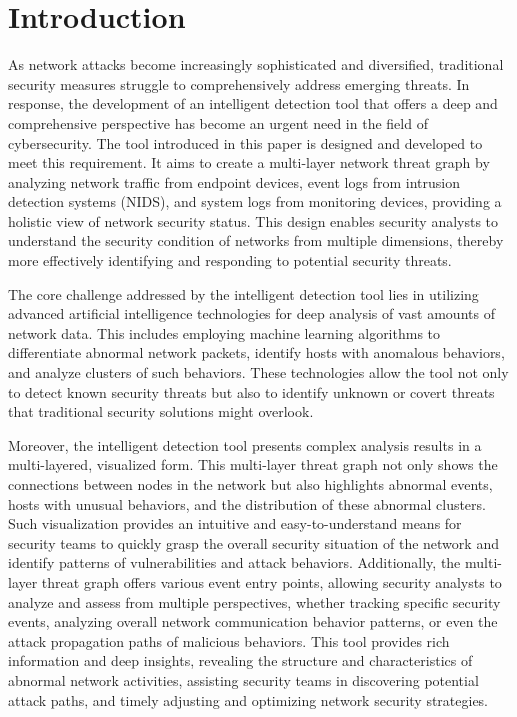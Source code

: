 \section{Introduction}
As network attacks become increasingly sophisticated and diversified, traditional security measures struggle to comprehensively address emerging threats. In response, the development of an intelligent detection tool that offers a deep and comprehensive perspective has become an urgent need in the field of cybersecurity. The tool introduced in this paper is designed and developed to meet this requirement. It aims to create a multi-layer network threat graph by analyzing network traffic from endpoint devices, event logs from intrusion detection systems (NIDS), and system logs from monitoring devices, providing a holistic view of network security status. This design enables security analysts to understand the security condition of networks from multiple dimensions, thereby more effectively identifying and responding to potential security threats.

The core challenge addressed by the intelligent detection tool lies in utilizing advanced artificial intelligence technologies for deep analysis of vast amounts of network data. This includes employing machine learning algorithms to differentiate abnormal network packets, identify hosts with anomalous behaviors, and analyze clusters of such behaviors. These technologies allow the tool not only to detect known security threats but also to identify unknown or covert threats that traditional security solutions might overlook.

Moreover, the intelligent detection tool presents complex analysis results in a multi-layered, visualized form. This multi-layer threat graph not only shows the connections between nodes in the network but also highlights abnormal events, hosts with unusual behaviors, and the distribution of these abnormal clusters. Such visualization provides an intuitive and easy-to-understand means for security teams to quickly grasp the overall security situation of the network and identify patterns of vulnerabilities and attack behaviors. Additionally, the multi-layer threat graph offers various event entry points, allowing security analysts to analyze and assess from multiple perspectives, whether tracking specific security events, analyzing overall network communication behavior patterns, or even the attack propagation paths of malicious behaviors. This tool provides rich information and deep insights, revealing the structure and characteristics of abnormal network activities, assisting security teams in discovering potential attack paths, and timely adjusting and optimizing network security strategies.

